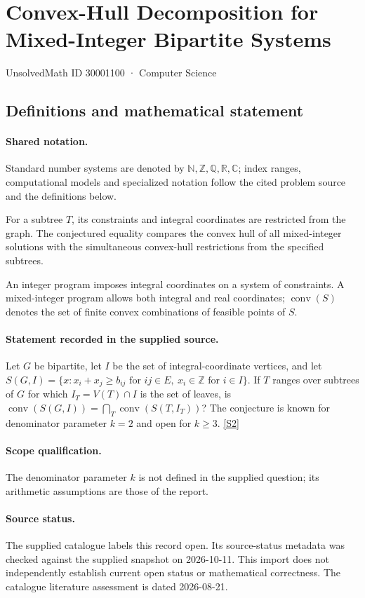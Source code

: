 \documentclass[11pt]{article}
\newcommand{\sref}[2]{\hyperlink{source:#1:#2}{[S#2]}}
\begin{document}
\setcounter{section}{30001099}
\section{Convex-Hull Decomposition for Mixed-Integer Bipartite Systems}\label{30001100}
{\small\sffamily UnsolvedMath ID 30001100 · Computer Science}
\subsection{Definitions and mathematical statement}

\paragraph{Shared notation.}Standard number systems are denoted by $\mathbb N,\mathbb Z,\mathbb Q,\mathbb R,\mathbb C$; index ranges, computational models and specialized notation follow the cited problem source and the definitions below.


For a subtree $T$, its constraints and integral coordinates are restricted from the graph. The conjectured equality compares the convex hull of all mixed-integer solutions with the simultaneous convex-hull restrictions from the specified subtrees.

An integer program imposes integral coordinates on a system of constraints. A mixed-integer program allows both integral and real coordinates; $\operatorname{conv}(S)$ denotes the set of finite convex combinations of feasible points of $S$.
\paragraph{Statement recorded in the supplied source.}
Let $G$ be bipartite, let $I$ be the set of integral-coordinate vertices, and let $S(G,I)=\{x:x_i+x_j\geq b_{ij}\text{ for }ij\in E,\ x_i\in\mathbb{Z}\text{ for }i\in I\}$. If $T$ ranges over subtrees of $G$ for which $I_T=V(T)\cap I$ is the set of leaves, is $\operatorname{conv}(S(G,I))=\bigcap_T\operatorname{conv}(S(T,I_T))$? The conjecture is known for denominator parameter $k=2$ and open for $k\geq3$. \sref{30001100}{2}
\paragraph{Scope qualification.}
The denominator parameter $k$ is not defined in the supplied question; its arithmetic assumptions are those of the report.
\paragraph{Source status.}
The supplied catalogue labels this record open. Its source-status metadata was checked against the supplied snapshot on 2026-10-11. This import does not independently establish current open status or mathematical correctness. The catalogue literature assessment is dated 2026-08-21.
\end{document}
